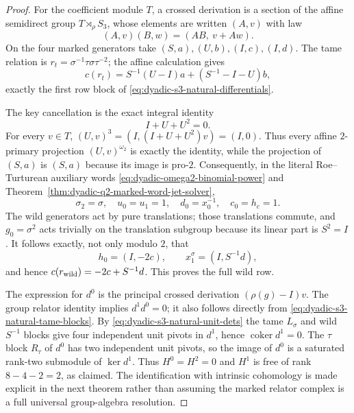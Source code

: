 \documentclass[11pt]{article}
\theoremstyle{definition}
\begin{document}
\begin{proof}
For the coefficient module $T$,
a crossed derivation is a section
of the affine semidirect group
$T\rtimes_\rho S_3$, whose elements
are written $(A,v)$ with law
\[
(A,v)(B,w)=(AB,\ v+Aw).
\]
On the four marked generators
take $(S,a),(U,b),(I,c),(I,d)$.
The tame relation is
$r_t=\sigma^{-1}\tau\sigma\tau^{-2}$;
the affine calculation gives
\[
c(r_t)
=S^{-1}(U-I)a+(S^{-1}-I-U)b,
\]
exactly the first row block of
\eqref{eq:dyadic-s3-natural-differentials}.

The key cancellation is the exact
integral identity
\[
I+U+U^2=0.
\]
For every $v\in T$,
$(U,v)^3=(I,(I+U+U^2)v)=(I,0)$.
Thus every affine $2$-primary
projection $(U,v)^{\omega_2}$
is exactly the identity, while
the projection of $(S,a)$ is
$(S,a)$ because its image
is pro-$2$.
Consequently, in the literal
Roe--Turturean auxiliary words
\eqref{eq:dyadic-omega2-binomial-power}
and Theorem~\ref{thm:dyadic-q2-marked-word-jet-solver},
\[
\sigma_2=\sigma,\quad
u_0=u_1=1,\quad
d_0=x_0^{-1},\quad c_0=h_c=1.
\]
The wild generators act by pure
translations; those translations
commute, and $g_0=\sigma^2$
acts trivially on the translation
subgroup because its linear part
is $S^2=I$.
It follows exactly, not only
modulo $2$, that
\[
h_0=(I,-2c),\qquad
x_1^\sigma=(I,S^{-1}d),
\]
and hence
$c(r_{\rm wild})=-2c+S^{-1}d$.
This proves the full wild row.

The expression for $d^0$
is the principal crossed
derivation $(\rho(g)-I)v$.
The group relator identity implies
$d^1d^0=0$; it also follows
directly from
\eqref{eq:dyadic-s3-natural-tame-blocks}.
By \eqref{eq:dyadic-s3-natural-unit-dets}
the tame $L_\sigma$ and wild
$S^{-1}$ blocks give four
independent unit pivots in
$d^1$, hence $\operatorname{coker}d^1=0$.
The $\tau$ block $R_\tau$
of $d^0$ has two independent
unit pivots, so the image
of $d^0$ is a saturated rank-two
submodule of $\ker d^1$.
Thus $H^0=H^2=0$ and
$H^1$ is free of rank
$8-4-2=2$, as claimed.
The identification with intrinsic
cohomology is made explicit in
the next theorem rather than
assuming the marked relator
complex is a full universal
group-algebra resolution.
\end{proof}
\end{document}
